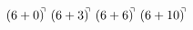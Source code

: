 \documentclass[preview]{standalone}
\begin{document}
\begin{align*}
(6+0)^{\hspace{-0.1cm}\urcorner} \ (6+3)^{\hspace{-0.1cm}\urcorner} \ (6+6)^{\hspace{-0.1cm}\urcorner} \ (6+10)^{\hspace{-0.1cm}\urcorner}
\end{align*}
\end{document}
